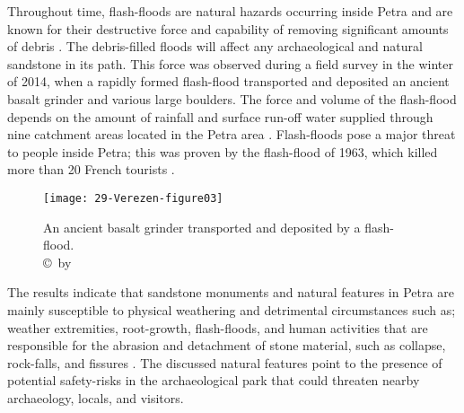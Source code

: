 Throughout  time, flash-floods are natural hazards occurring inside Petra and are known for
their destructive force and capability of removing significant amounts of debris \parencites[78--84]{franchi2009}[104]{ortloff2005}.
The debris-filled floods will affect any archaeological and natural sandstone in its path.
This force was observed during a field survey in the winter of 2014, when a rapidly formed flash-flood transported and deposited an ancient basalt grinder  and various large boulders.
The force and volume of the flash-flood depends on the amount of rainfall and surface run-off water supplied through
nine catchment areas located in the Petra area \parencites[171--172]{alweshahr1999}[130]{nichols2009}.
Flash-floods pose a major threat to people inside Petra; this was proven by the flash-flood of 1963,
which killed more than \num{20} French tourists \parencites[55--57]{comer2012}[55]{lingis2002}.

\begin{figure}[!htb]
	\texttt{[image: 29-Verezen-figure03]}
	\caption{An ancient basalt grinder transported and deposited by a flash-flood.
		{\normalfont\scriptsize \\ \copyright\ by \shortauthor
	}}
	\label{fig:29-Verezen-figure03}
\end{figure}

The  results indicate that sandstone monuments and natural features in Petra are mainly susceptible to
physical weathering and detrimental circumstances such as; weather extremities, root-growth, flash-floods,
and human activities that are responsible for the abrasion and detachment of stone material, such as collapse, rock-falls, and
fissures  \parencites[267--284]{balaawi2011}[653]{heinrichs2008}[230]{turkington2005}.
The discussed natural features point to the presence of potential safety-risks in the archaeological park that
could threaten nearby archaeology, locals, and visitors.

